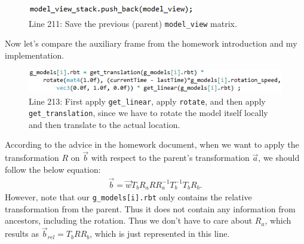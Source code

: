 \documentclass[11pt]{article}
\begin{document}
\begin{figure}[htb]
	\begin{center}
		\includegraphics[width=0.5\linewidth]{modelStack.png}
	\end{center}
	\caption{Line 211: Save the previous (parent) \texttt{model\_view} matrix.}
\end{figure}

Now let's compare the auxiliary frame from the homework introduction and my implementation.
\newpage
\begin{figure}[htb]
	\begin{center}
		\includegraphics[width=1.0\linewidth]{applyLocalRotation.png}
	\end{center}
	\caption{Line 213: First apply \texttt{get\_linear}, apply \texttt{rotate}, and then apply \texttt{get\_translation}, since we have to rotate the model itself locally and then translate to the actual location.}
\end{figure}
According to the advice in the homework document, when we want to apply the transformation $R$ on $\vec{b}$ with respect to the parent's transformation $\vec{a}$, we should follow the below equation:
\begin{align*}
\vec{b} = \vec{w}T_b R_a R R_a^{-1} T_b^{-1} T_b R_b.
\end{align*}
However, note that our \texttt{g\_models[i].rbt} only contains the relative transformation from the parent. Thus it does not contain any information from ancestors, including the rotation. Thus we don't have to care about $R_a$, which results as $\vec{b}_{rel} = T_b R R_b$, which is just represented in this line.
\end{document}
